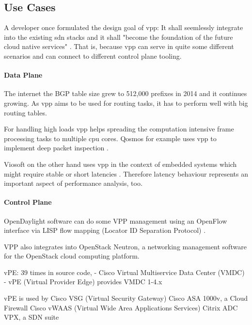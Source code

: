 \subsection{Use Cases}


A developer once formulated the design goal of \Ac{vpp}: It shall seemlessly integrate into the existing \Ac{sdn} stacks and it shall "become the foundation of the future cloud native services" \cite{florincoras}. That is, because \Ac{vpp} can serve in quite some different scenarios and can connect to different control plane tooling. 

\paragraph{Data Plane}


The internet the BGP table size grew to 512,000 prefixes in 2014 and
it continues growing. As \Ac{vpp} aims to be used for routing tasks,
it has to perform well with big routing tables.

For handling high loads \Ac{vpp} helps spreading the computation
intensive frame processing tasks to multiple cpu cores. Qosmos for
example uses \Ac{vpp} to implement deep packet inspection
\cite{qosmos}.

Viosoft on the other hand uses \Ac{vpp} in the context of embedded
systems which might require stable or short latencies \cite{viosoft}.
Therefore latency behaviour represents an important aspect of
performance analysis, too.

\paragraph{Control Plane}

OpenDaylight software can do some VPP management using an OpenFlow interface via LISP flow mapping (Locator ID Separation Protocol) \cite{opendaylight:lisp}. 

VPP also integrates into OpenStack Neutron, a networking management software for the OpenStack cloud computing platform.


vPE: 39 times in source code, 
- Cisco Virtual Multiservice Data Center (VMDC)
- vPE (Virtual Provider Edge) provides VMDC 1-4.x

vPE is used by 
Cisco VSG (Virtual Security Gateway)
Cisco ASA 1000v, a Cloud Firewall
Cisco vWAAS (Virtual Wide Area Applications Services)
Citrix ADC VPX, a SDN suite





